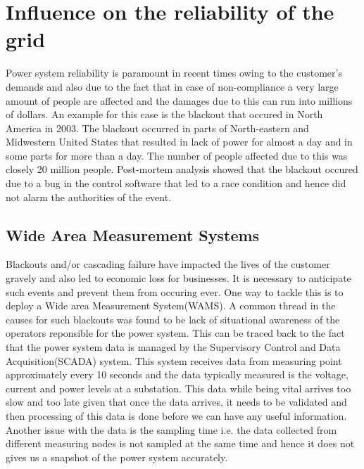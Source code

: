 \documentclass[11pt,a4paper]{article}
\begin{document}
\section{Influence on the reliability of  the grid}
Power system reliability is paramount in recent times owing to the customer's demands and also due to the fact that in case of non-compliance a very large amount of people are affected and the damages due to this can run into millions of dollars. An example for this case is the blackout that occured in North America in 2003. The blackout occurred in parts of North-eastern and Midwestern United States that resulted in lack of power for almost a day and in some parts for more than a day. The number of people affected due to this was closely 20 million people. Post-mortem analysis showed that the blackout occured due to a bug in the control software that led to a race condition and hence did not alarm the authorities of the event\cite{pmudeploy2012}.

\subsection{Wide Area Measurement Systems}
Blackouts and/or cascading failure have impacted the lives of the customer gravely and also led to economic loss for businesses. It is necessary to anticipate such events and prevent them from occuring ever. One way to tackle this is to deploy a Wide area Measurement System(WAMS). A common thread in the causes for such blackouts was found to be lack of situational awareness of the operators reponsible for the power system. This can be traced back to the fact that the power system data is managed by the Supervisory Control and Data Acquisition(SCADA) system. This system receives data from measuring point approximately every 10 seconds and the data typically measured is the voltage, current and power levels at a substation. This data while being vital arrives too slow and too late given that once the data arrives, it needs to be validated and then processing of this data is done before we can have any useful information. Another issue with the data is the sampling time i.e. the data collected from different measuring nodes is not sampled at the same time and hence it does not gives us a snapshot of the power system accurately.
\end{document}
